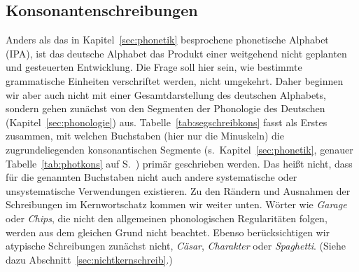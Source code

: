 \label{sec:buchstabensegmente}

\subsection{Konsonantenschreibungen}

\label{sec:konssegschreib}

Anders als das in Kapitel~\ref{sec:phonetik} besprochene phonetische Alphabet (IPA), ist das deutsche Alphabet das Produkt einer weitgehend nicht geplanten und gesteuerten Entwicklung.
Die Frage soll hier sein, wie bestimmte grammatische Einheiten verschriftet werden, nicht umgekehrt.
Daher beginnen wir aber auch nicht mit einer Gesamtdarstellung des deutschen Alphabets, sondern gehen zunächst von den Segmenten der Phonologie des Deutschen (Kapitel~\ref{sec:phonologie}) aus.
Tabelle~\ref{tab:segschreibkons} fasst als Erstes zusammen, mit welchen Buchstaben (hier nur die Minuskeln) die zugrundeliegenden konsonantischen Segmente (s.\ Kapitel~\ref{sec:phonetik}, genauer Tabelle~\ref{tab:photkons} auf S.~\pageref{tab:photkons}) primär geschrieben werden.
Das heißt nicht, dass für die genannten Buchstaben nicht auch andere systematische oder unsystematische Verwendungen existieren.
Zu den Rändern und Ausnahmen der Schreibungen im Kernwortschatz kommen wir weiter unten.
Wörter wie \textit{Garage} oder \textit{Chips}, die nicht den allgemeinen phonologischen Regularitäten folgen, werden aus dem gleichen Grund nicht beachtet.
Ebenso berücksichtigen wir atypische Schreibungen zunächst nicht, \zB \textit{Cäsar}, \textit{Charakter} oder \textit{Spaghetti}.
(Siehe dazu Abschnitt~\ref{sec:nichtkernschreib}.)

